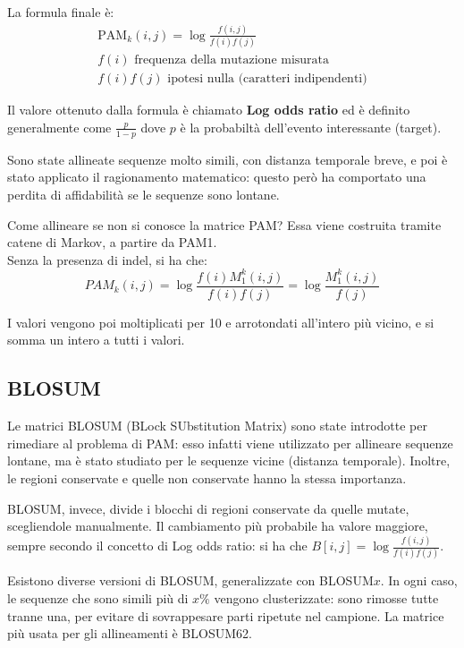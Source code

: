 La formula finale è:
\begin{align*}
\text{PAM}_k(i, j) = \log \frac{f(i, j)}{f(i)f(j)} \\
f(i) \text{ frequenza della mutazione misurata} \\
f(i)f(j) \text{ ipotesi nulla (caratteri indipendenti)}
\end{align*}

Il valore ottenuto dalla formula è chiamato \textbf{Log odds ratio} ed è definito generalmente come $\frac{p}{1-p}$ dove $p$ è la probabiltà dell'evento interessante (target).

Sono state allineate sequenze molto simili, con distanza temporale breve, e poi è stato applicato il ragionamento matematico: questo però ha comportato una perdita di affidabilità se le sequenze sono lontane.

Come allineare se non si conosce la matrice PAM? Essa viene costruita tramite catene di Markov, a partire da PAM1. \\
Senza la presenza di indel, si ha che:
\begin{equation*}
	PAM_{k}(i, j) = \log\frac{f(i)M_{1}^{k}(i, j)}{f(i)f(j)} = \log\frac{M_{1}^{k}(i, j)}{f(j)}
\end{equation*}

I valori vengono poi moltiplicati per 10 e arrotondati all'intero più vicino, e si somma un intero a tutti i valori.

\subsection{BLOSUM}
Le matrici BLOSUM (BLock SUbstitution Matrix) sono state introdotte per rimediare al problema di PAM: esso infatti viene utilizzato per allineare sequenze lontane, ma è stato studiato per le sequenze vicine (distanza temporale). Inoltre, le regioni conservate e quelle non conservate hanno la stessa importanza.

BLOSUM, invece, divide i blocchi di regioni conservate da quelle mutate, scegliendole manualmente. Il cambiamento più probabile ha valore maggiore, sempre secondo il concetto di Log odds ratio: si ha che $B[i, j] = \log \frac{f(i, j)}{f(i)f(j)}$.

Esistono diverse versioni di BLOSUM, generalizzate con BLOSUM$x$. In ogni caso, le sequenze che sono simili più di $x\%$ vengono clusterizzate: sono rimosse tutte tranne una, per evitare di sovrappesare parti ripetute nel campione. La matrice più usata per gli allineamenti è BLOSUM62.

